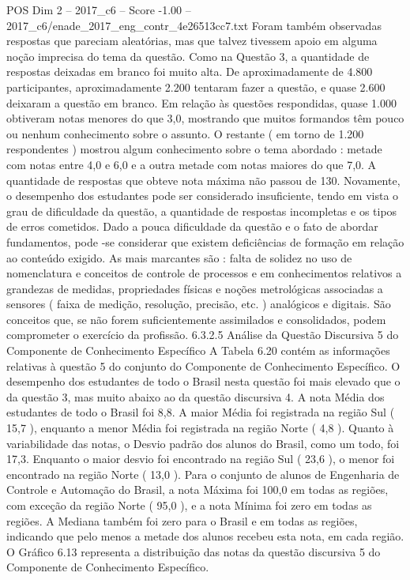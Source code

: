 \begin{textsample}{POS Dim 2 – 2017\_c6 – Score -1.00 – 2017\_c6/enade\_2017\_eng\_contr\_4e26513cc7.txt}
Foram também observadas respostas que pareciam aleatórias, mas que talvez tivessem apoio em alguma noção imprecisa do tema da questão.
Como na Questão 3, a quantidade de respostas deixadas em branco foi muito alta.
De aproximadamente de 4.800 participantes, aproximadamente 2.200 tentaram fazer a questão, e quase 2.600 deixaram a questão em branco.
Em relação às questões respondidas, quase 1.000 obtiveram notas menores do que 3,0, mostrando que muitos formandos têm pouco ou nenhum conhecimento sobre o assunto.
O restante ( em torno de 1.200 respondentes ) mostrou algum conhecimento sobre o tema abordado : metade com notas entre 4,0 e 6,0 e a outra metade com notas maiores do que 7,0.
A quantidade de respostas que obteve nota máxima não passou de 130.
Novamente, o desempenho dos estudantes pode ser considerado insuficiente, tendo em vista o grau de dificuldade da questão, a quantidade de respostas incompletas e os tipos de erros cometidos.
Dado a pouca dificuldade da questão e o fato de abordar fundamentos, pode -se considerar que existem deficiências de formação em relação ao conteúdo exigido.
As mais marcantes são : falta de solidez no uso de nomenclatura e conceitos de controle de processos e em conhecimentos relativos a grandezas de medidas, propriedades físicas e noções metrológicas associadas a sensores ( faixa de medição, resolução, precisão, etc. ) analógicos e digitais.
São conceitos que, se não forem suficientemente assimilados e consolidados, podem comprometer o exercício da profissão. 6.3.2.5 Análise da Questão Discursiva 5 do Componente de Conhecimento Específico A Tabela 6.20 contém as informações relativas à questão 5 do conjunto do Componente de Conhecimento Específico.
O desempenho dos estudantes de todo o Brasil nesta questão foi mais elevado que o da questão 3, mas muito abaixo ao da questão discursiva 4.
A nota Média dos estudantes de todo o Brasil foi 8,8.
A maior Média foi registrada na região Sul ( 15,7 ), enquanto a menor Média foi registrada na região Norte ( 4,8 ).
Quanto à variabilidade das notas, o Desvio padrão dos alunos do Brasil, como um todo, foi 17,3.
Enquanto o maior desvio foi encontrado na região Sul ( 23,6 ), o menor foi encontrado na região Norte ( 13,0 ).
Para o conjunto de alunos de Engenharia de Controle e Automação do Brasil, a nota Máxima foi 100,0 em todas as regiões, com exceção da região Norte ( 95,0 ), e a nota Mínima foi zero em todas as regiões.
A Mediana também foi zero para o Brasil e em todas as regiões, indicando que pelo menos a metade dos alunos recebeu esta nota, em cada região.
O Gráfico 6.13 representa a distribuição das notas da questão discursiva 5 do Componente de Conhecimento Específico.

\end{textsample}
